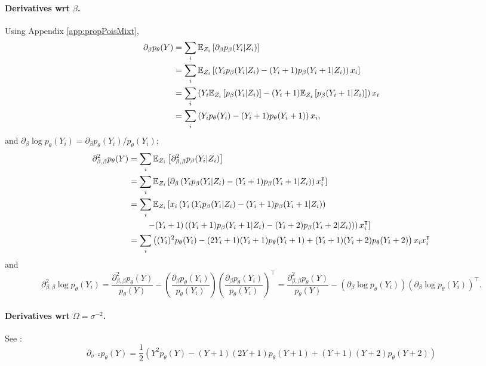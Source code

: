 \paragraph{Derivatives wrt $\beta$.}
Using Appendix \ref{app:propPoisMixt},
\begin{align*}
  \partial_{\beta} p_\theta(Y) 
  & = \sum_i \mathbb E_{Z_i} \left[ \partial_{\beta} p_{\beta}(Y_i|Z_i) \right] \\
  & = \sum_i \mathbb E_{Z_i} \left[ \left( Y_i p_{\beta}(Y_i|Z_i) - (Y_i +1)p_{\beta}(Y_i+1|Z_i) \right) x_i \right] \\
  & = \sum_i \left( Y_i \mathbb E_{Z_i} \left[ p_{\beta}(Y_i|Z_i) \right] 
  -(Y_i +1) \mathbb E_{Z_i} \left[ p_{\beta}(Y_i+1|Z_i) \right] \right) x_i \\
  & = \sum_i \left(Y_i p_\theta(Y_i) -(Y_i +1)p_\theta(Y_i+1)\right) x_i,
\end{align*}
and $\partial_{\beta} \log p_\theta(Y_i) = \partial_{\beta} p_\theta(Y_i) / p_\theta(Y_i) $; 
\begin{align*}
  \partial^2_{\beta, \beta} p_\theta(Y) 
  & = \sum_i \mathbb E_{Z_i} \left[ \partial^2_{\beta, \beta} p_{\beta}(Y_i|Z_i) \right] \\
  & = \sum_i \mathbb E_{Z_i} \left[ \partial_{\beta} \left( Y_i p_{\beta}(Y_i|Z_i) - (Y_i +1)p_{\beta}(Y_i+1|Z_i) \right) x_i^\intercal \right] \\
  & = \sum_i \mathbb E_{Z_i} \left[ x_i \left( Y_i \left( Y_i p_{\beta}(Y_i|Z_i) - (Y_i +1)p_{\beta}(Y_i+1|Z_i) \right) \right. \right. \\
  & \qquad \left. \left. - (Y_i +1) \left( (Y_i+1) p_{\beta}(Y_i+1|Z_i) - (Y_i +2)p_{\beta}(Y_i+2|Z_i) \right) \right) x_i^\intercal \right] \\
  & = \sum_i \left((Y_i)^2 p_\theta(Y_i) - (2 Y_i+1) (Y_i+1) p_\theta(Y_i+1) + (Y_i+1) (Y_i+2) p_\theta(Y_i+2) \right) x_i x_i^\intercal
\end{align*}
and
$$
\partial^2_{\beta, \beta} \log p_\theta(Y_i) 
= \frac{\partial^2_{\beta, \beta} p_\theta(Y)}{p_\theta(Y)} - \left(\frac{\partial_{\beta}p_\theta(Y_i)}{p_\theta(Y_i)}\right) \left(\frac{\partial_{\beta}p_\theta(Y_i)}{p_\theta(Y_i)}\right)^\intercal
= \frac{\partial^2_{\beta, \beta} p_\theta(Y)}{p_\theta(Y)} - \left(\partial_{\beta} \log p_\theta(Y_i)\right) \left(\partial_{\beta} \log p_\theta(Y_i)\right)^\intercal.
$$

\paragraph{Derivatives wrt $\Omega = \sigma^{-2}$.} See \cite{Izs08}:
$$
\partial_{\sigma^{-2}} p_\theta(Y) 
= \frac12 \left(Y^2 p_\theta(Y) - (Y+1)(2Y+1) p_\theta(Y+1) + (Y+1)(Y+2) p_\theta(Y+2) \right)
$$
